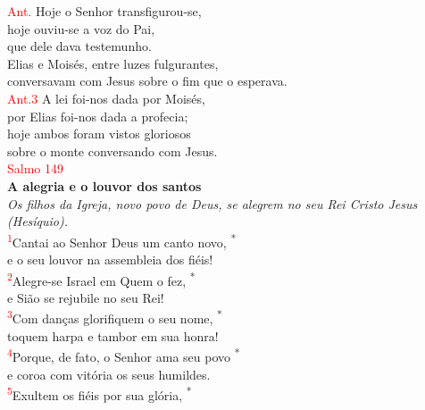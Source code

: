\documentclass{book}
\begin{document}
\begin{center}
    \textcolor{red}{Ant.} Hoje o Senhor transfigurou-se, \\
    hoje ouviu-se a voz do Pai, \\
    que dele dava testemunho. \\
    Elias e Moisés, entre luzes fulgurantes, \\
    conversavam com Jesus sobre o fim que o esperava.
    \vspace{.2cm} \\
    \textcolor{red}{Ant.3} A lei foi-nos dada por Moisés, \\
    por Elias foi-nos dada a profecia; \\
    hoje ambos foram vistos gloriosos \\
    sobre o monte conversando com Jesus.
    \vspace{.2cm} \\
    \textcolor{red}{Salmo 149}
    \vspace{.2cm} \\
    \textbf{A alegria e o louvor dos santos} \\
    \textit{Os filhos da Igreja, novo povo de Deus, se alegrem no seu Rei Cristo Jesus (Hesíquio).}
    \vspace{.2cm} \\
    \textsuperscript{\underline{\hspace{.06in}}\textcolor{red}{1}}Cantai ao Senhor Deus um canto novo, \textsuperscript{*} \\
    e o seu louvor na assembleia dos fiéis! \\
    \textsuperscript{\underline{\hspace{.06in}}\textcolor{red}{2}}Alegre-se Israel em Quem o fez, \textsuperscript{*} \\
    e Sião se rejubile no seu Rei! \\
    \textsuperscript{\underline{\hspace{.06in}}\textcolor{red}{3}}Com danças glorifiquem o seu nome, \textsuperscript{*} \\
    toquem harpa e tambor em sua honra!
    \vspace{.2cm} \\
    \textsuperscript{\underline{\hspace{.06in}}\textcolor{red}{4}}Porque, de fato, o Senhor ama seu povo \textsuperscript{*} \\
    e coroa com vitória os seus humildes. \\
    \textsuperscript{\underline{\hspace{.06in}}\textcolor{red}{5}}Exultem os fiéis por sua glória, \textsuperscript{*} \\

\end{center}
\end{document}
